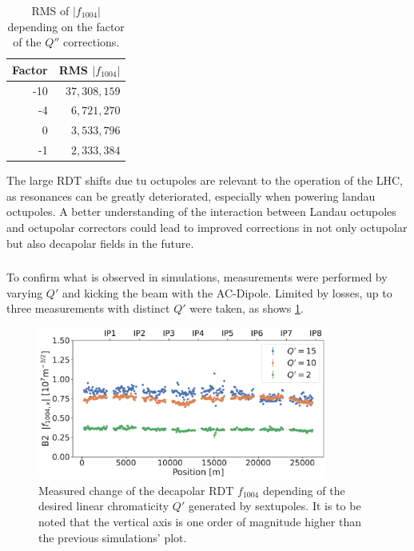 \begin{table}[!htb]
    \centering
    \begin{tabular}{rr}
    \toprule
    Factor & RMS $|f_{1004}|$ \\
    \midrule
       -10 & $37,308,159$         \\ 
        -4 &  $6,721,270$          \\ 
         0 &  $3,533,796$          \\ 
        -1 &  $2,333,384$          \\
    \bottomrule
    \end{tabular}
    \caption{RMS of $|f_{1004}|$ depending on the factor of the $Q''$ corrections.}
    \label{table:decapoles:corrections_dq2_f1004_rms}
\end{table}

The large RDT shifts due tu octupoles are relevant to the operation of the LHC, as
resonances can be greatly deteriorated, especially when powering landau octupoles.
A better understanding of the interaction between Landau octupoles and octupolar correctors could
lead to improved corrections in not only octupolar but also decapolar fields in the future.



\FloatBarrier
\subsubsection{}

To confirm what is observed in simulations, measurements were performed by varying $Q'$ and kicking
the beam with the AC-Dipole. Limited by losses, up to three measurements with distinct $Q'$ were
taken, as shows \cref{fig:decapoles:rdts:measured_f1004_from_sextupoles}.

\begin{figure}[!htb]
    \centering
    \includegraphics[width=0.85\textwidth]{./images/f1004/f1004x_q2_q10_q15.pdf}
    \caption{Measured change of the decapolar RDT $f_{1004}$ depending of the desired linear
    chromaticity $Q'$ generated by sextupoles. It is to be noted that the vertical axis is one
    order of magnitude higher than the previous simulations' plot.
    }
    \label{fig:decapoles:rdts:measured_f1004_from_sextupoles}
\end{figure}

